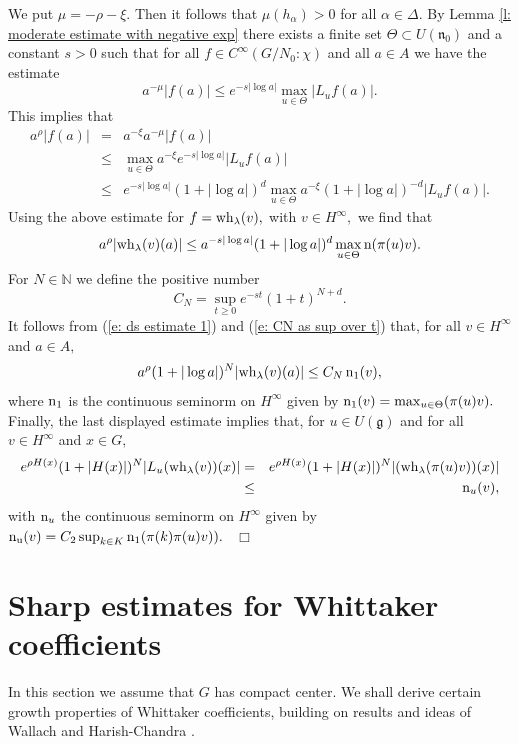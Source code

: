 \documentclass[12pt,a4paper]{article}
\def\proof{\par\noindent{\it Proof.}{\ }{\ }}
\def\qed{~\hfill\hbox{$\Box$}\medbreak}
\def\msy#1{{\mathbb #1}}
\def\N{{\msy N}}
\def\ga{\alpha}
\def\gl{\lambda}
\def\gD{\Delta}
\def\got#1{\mathfrak #1}
\def\fg{{\got g}}
\def\fn{{\got n}}
\numberwithin{Thm}{section}
\numberwithin{equation}{section}
\numberwithin{equation}{section}
\def\wh{{\rm wh}}
\def\col{\!:\!}
\def\cchi{\chi}
\begin{document}
\proof
We put $\mu = -\rho - \xi.$ Then it follows that $\mu(h_\ga) > 0$ 
for all $\ga \in \gD.$ By Lemma \ref{l: moderate estimate with negative exp} there exists a finite set $\Theta\subset U(\fn_0)$ and  a 
constant $s > 0$ such that for all $f \in C^\infty(G/N_0\col \cchi)$ and all $a \in A$ we have the estimate
$$ 
a^{-\mu} |f(a)| \leq e^{-s|\log a|} \max_{u \in \Theta} |L_u f(a)|.
$$%
This implies that 
\begin{eqnarray*}
a^\rho |f(a)| 
&= &  a^{-\xi}  a^{-\mu} |f(a)| \\
&\leq & \max_{u \in \Theta}  a^{-\xi} e^{-s|\log a|} |L_u f (a)|\\
&\leq & e^{-s| \log a|} (1 +|\log a|)^{d} \max_{u \in \Theta}  a^{-\xi} (1+|\log a|)^{-d} |L_u f(a)|.\end{eqnarray*}
Using the above estimate for $f = \wh_\gl(v),$ with $v \in H^\infty,$ we find that
\begin{equation}
\label{e: ds estimate 1}
a^\rho |\wh_\gl(v)(a)| \leq a^{-s|\log a|}(1 +|\log a|)^{d} \max_{u\in \Theta} {\rm n}(\pi(u) v).
\end{equation}
For $N \in \N$ we define the positive number
\begin{equation}
\label{e: CN as sup over t} 
C_N = \sup_{t \geq 0} e^{-st} (1 + t)^{N +d}.
\end{equation} 
It follows from (\ref{e: ds estimate 1}) and (\ref{e: CN as sup over t}) that, for all $v \in H^\infty$ and $a\in A,$ 
$$ 
a^\rho (1 + | \log a|)^N |\wh_\gl(v)(a)| \leq C_N \, {\rm n_1}(v),
$$%
where ${\rm n}_1$ is the continuous seminorm on $H^\infty$ given by 
${\rm n}_1 (v) = \max_{u\in \Theta} (\pi(u) v).$ 
Finally, the last displayed estimate implies that,
for $u \in U(\fg)$ and for all 
$v \in H^\infty$ and $x \in G,$
\begin{eqnarray*}
e^{\rho H(x)} ( 1 + | H(x)|)^N |L_u (\wh_\gl(v))( x)| &=& e^{\rho H(x)} ( 1 + | H(x)|)^N |(\wh_\gl(\pi(u) v))( x)|\\
&\leq & 
 {\rm n}_u (v),
\end{eqnarray*}
 with ${\rm n}_u$ the continuous seminorm on $H^\infty$ 
given by ${\rm n_u}(v) = C_2 \sup_{k \in K} {\rm n}_1( \pi(k)\pi(u)v)).$ 
\qed

\section{Sharp estimates for Whittaker coefficients}
\label{s: sharp estimates of whit coeff}
In this section we assume that $G$ has compact center. 
We shall derive certain growth properties of Whittaker 
coefficients, building on results and ideas of Wallach \cite{Wrrg2} and Harish-Chandra
\cite{HCwhit}. 
\end{document}
